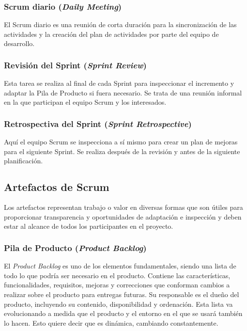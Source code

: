 \subsubsection{Scrum diario (\textit{Daily Meeting})}
El Scrum diario \cite{Schwaber2017} es una reunión de corta duración para la sincronización de las actividades y la creación del plan de actividades por parte del equipo de desarrollo.

\subsubsection{Revisión del Sprint (\textit{Sprint Review})}
Esta tarea se realiza al final de cada Sprint para inspeccionar el incremento y adaptar la Pila de Producto si fuera necesario. Se trata de una reunión informal en la que participan el equipo Scrum y los interesados.

\subsubsection{Retrospectiva del Sprint (\textit{Sprint Retrospective})}
Aquí el equipo Scrum se inspecciona a sí mismo para crear un plan de mejoras para el siguiente Sprint. Se realiza después de la revisión y antes de la siguiente planificación.

\newpage

\subsection{Artefactos de Scrum}
Los artefactos representan trabajo o valor en diversas formas que son útiles para proporcionar transparencia y oportunidades de adaptación e inspección y deben  estar al alcance de todos los participantes en el proyecto.

\subsubsection{Pila de Producto (\textit{Product Backlog})}
El \textit{Product Backlog} es uno de los elementos fundamentales, siendo una lista de todo lo que podría ser necesario en el producto. Contiene las características, funcionalidades, requisitos, mejoras y correcciones que conforman cambios a realizar sobre el producto para entregas futuras. Su responsable es el dueño del producto, incluyendo su contenido, disponibilidad y ordenación. Esta lista va evolucionando a medida que el producto y el entorno en el que se usará también lo hacen. Esto quiere decir que es dinámica, cambiando constantemente.


